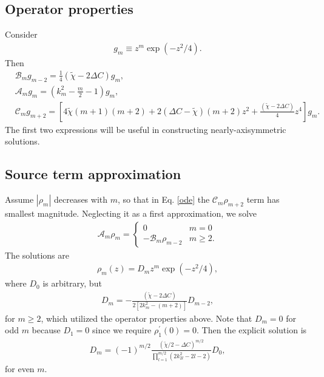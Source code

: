 \documentclass[12pt]{article} %
\begin{document}
\subsection{Operator properties}
Consider
\begin{align}
	g_m \equiv z^m\exp{(-z^2/4)}.
\end{align}
Then
\begin{align}
&\mathcal{B}_mg_{m-2} =\frac{1}{4}\left(\tilde{\chi} - 2\Delta C\right)g_m,\\
&\mathcal{A}_mg_m = \left(k_m^2 - \frac{m}{2} - 1\right)g_m,\\
&\mathcal{C}_mg_{m+2} = \left[4\tilde{\chi}(m+1)(m+2) +2(\Delta C-\tilde{\chi})(m+2)z^2 + \frac{\left(\tilde{\chi} - 2\Delta C\right)}{4}z^4\right]g_m. 
\end{align}
The first two expressions will be useful in constructing nearly-axisymmetric solutions. 

\subsection{Source term approximation}
Assume $|\rho_m|$ decreases with $m$, so that in Eq. \ref{ode} the $\mathcal{C}_m\rho_{m+2}$ term has smallest magnitude.  Neglecting it as a first approximation, we solve
\begin{align}
\mathcal{A}_m\rho_m = \begin{cases}
        0 & m =0 \\
	-\mathcal{B}_m\rho_{m-2} & m \geq 2.
\end{cases}
\end{align}
The solutions are 
\begin{align}
\rho_m (z)= D_m z^m\exp{(-z^2/4)},
\end{align}
where $D_0$ is arbitrary, but
\begin{align}
D_m  = -\frac{\left(\tilde{\chi} - 2\Delta C\right)}{2\left[2k_m^2 - (m+2)\right]}D_{m-2},
\end{align}
for $m\geq2$, which utilized the operator properties above. Note that $D_m=0$ for odd $m$ because $D_1=0$ since 
we require $\rho_1^\prime(0)=0$. Then the explicit solution is
\begin{align}
D_m  = \left(-1\right)^{m/2}\frac{\left(\tilde{\chi}/2-\Delta C\right)^{m/2}}{\prod_{l=1}^{m/2}
\left(2k_{2l}^2 -2l - 2\right)}D_0,
\end{align}
for even $m$. 
\end{document}
